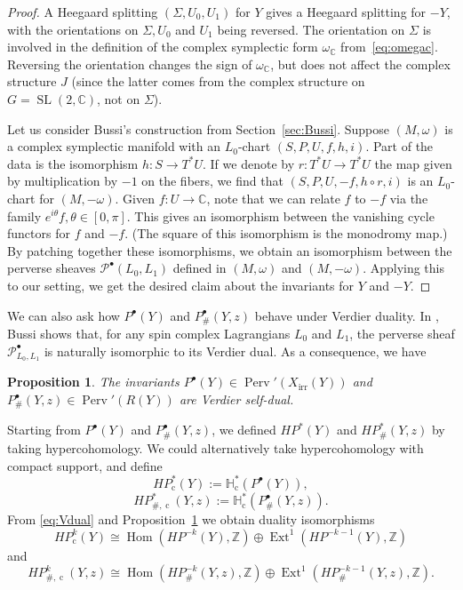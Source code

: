 \documentclass [11pt]{amsart}
\newtheorem {proposition}[theorem]{Proposition}
\theoremstyle{remark}
\def\zz {{\mathbb{Z}}}
\def\cc {{\mathbb{C}}}
\def\C{\cc}
\def\Z {\zz}
\def\HP{\mathit{HP}}
\def\HH{\mathbb{H}}
\def\cs{\operatorname{c}}
\def\sl {{\operatorname{SL}(2, \cc)}}
\def\Rep {R}
\def\Char {X}
\def\CharIrr {\Char_{\operatorname{irr}}}
\def\Hom {\operatorname{Hom}}
\def\Perv {\operatorname{Perv}}
\DeclareMathOperator{\Ext}{\operatorname{Ext}}
\def\HPcs{\HP_{\! \cs}}
\def\HPf{\HP_{\! \#}}
\def\HPfcs{\HP_{\! \#, \cs}}
\def\Pb {\mathcal{P}^\bullet}
\begin{document}
 \begin{proof}
 A Heegaard splitting $(\Sigma, U_0, U_1)$ for $Y$ gives a Heegaard splitting for $-Y$, with the orientations on $\Sigma, U_0$ and $U_1$ being reversed. The orientation on $\Sigma$ is involved in the definition of the complex symplectic form $\omega_{\C}$ from~\eqref{eq:omegac}. Reversing the orientation changes the sign of $\omega_{\C}$, but does not affect the complex structure $J$ (since the latter comes from the complex structure on $G=\sl$, not on $\Sigma$). 
 
Let us consider Bussi's construction from Section~\ref{sec:Bussi}. Suppose $(M, \omega)$ is a complex symplectic manifold with an $L_0$-chart $(S, P, U, f, h, i)$. Part of the data is the isomorphism $h: S \to T^*U$. If we denote by $r: T^*U \to T^*U$ the map given by multiplication by $-1$ on the fibers, we find that $(S, P, U, -f, h \circ r, i)$ is an $L_0$-chart for $(M, -\omega)$. Given $f: U \to \C$, note that we can relate $f$ to $-f$ via the family $e^{i\theta}f, \theta \in [0, \pi]$. This gives an isomorphism between the vanishing cycle functors for $f$ and $-f$. (The square of this isomorphism is the monodromy map.) By patching together these isomorphisms, we obtain an isomorphism between the perverse sheaves $\Pb(L_0, L_1)$ defined in $(M, \omega)$ and $(M, -\omega)$. Applying this to our setting, we get the desired claim about the invariants for $Y$ and $-Y$. 
 \end{proof}

We can also ask how $P^{\bullet}(Y)$ and $P^{\bullet}_\#(Y, z)$ behave under Verdier duality. In \cite[Theorem 2.1]{Bussi}, Bussi shows that, for any spin complex Lagrangians $L_0$ and $L_1$, the perverse sheaf $\Pb_{L_0, L_1}$ is naturally isomorphic to its Verdier dual. As a consequence, we have
\begin{proposition}
\label{prop:Vsd}
The invariants $P^{\bullet}(Y) \in \Perv'(\CharIrr(Y))$ and $ P^{\bullet}_\#(Y,z) \in \Perv'(\Rep(Y))$ are Verdier self-dual.
\end{proposition}

Starting from $P^{\bullet}(Y)$ and $P^{\bullet}_\#(Y,z)$, we defined $\HP^*(Y)$ and $\HPf^*(Y,z)$ by taking hypercohomology. We could alternatively take hypercohomology with compact support, and define
$$ \HPcs^*(Y) := \HH_{\cs}^*( P^{\bullet}(Y)),$$
$$ \HPfcs^*(Y,z) := \HH_{\cs}^*( P^{\bullet}_{\#}(Y,z)).$$
From \eqref{eq:Vdual} and Proposition~\ref{prop:Vsd} we obtain duality isomorphisms 
$$ \HPcs^k(Y) \cong \Hom(\HP^{-k}(Y), \Z) \oplus \Ext^1(\HP^{-k-1}(Y), \Z)$$
and
$$ \HPfcs^k(Y,z) \cong \Hom(\HPf^{-k}(Y,z), \Z) \oplus \Ext^1(\HPf^{-k-1}(Y,z), \Z).$$
\end{document}
